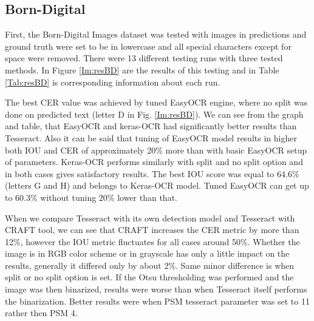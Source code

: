 \subsection*{Born-Digital}

First, the Born-Digital Images dataset was tested with images in predictions and ground truth were set to be in lowercase and all special characters except for space were removed. There were 13 different testing runs with three tested methods.  In Figure \ref*{Im:resBD} are the results of this testing and in Table \ref*{Tab:resBD} is corresponding information about each run. 

The best CER value was achieved by tuned EasyOCR engine, where no split was done on predicted text (letter D in Fig. \ref*{Im:resBD}). We can see from the graph and table, that EasyOCR and keras-OCR had significantly better results than Tesseract. Also it can be said that tuning of EasyOCR model results in higher both IOU and CER of approximately 20\% more than with basic EasyOCR setup of parameters. Keras-OCR performs similarly with split and no split option and in both cases gives satisfactory results. The best IOU score was equal to $64.6\%$ (letters G and H) and belongs to Keras-OCR model. Tuned EasyOCR can get up to $60.3\%$ without tuning $20\%$ lower than that.

When we compare Tesseract with its own detection model and Tesseract with CRAFT tool, we can see that CRAFT increases the CER metric by more than 12\%, however the IOU metric fluctuates for all cases around 50\%. Whether the image is in RGB color scheme or in grayscale has only a little impact on the results, generally it differed only by about 2\%. Same minor difference is when split or no split option is set. If the Otsu thresholding was performed and the image was then binarized, results were worse than when Tesseract itself performs the binarization. Better results were when PSM tesseract parameter was set to 11 rather then PSM 4.

